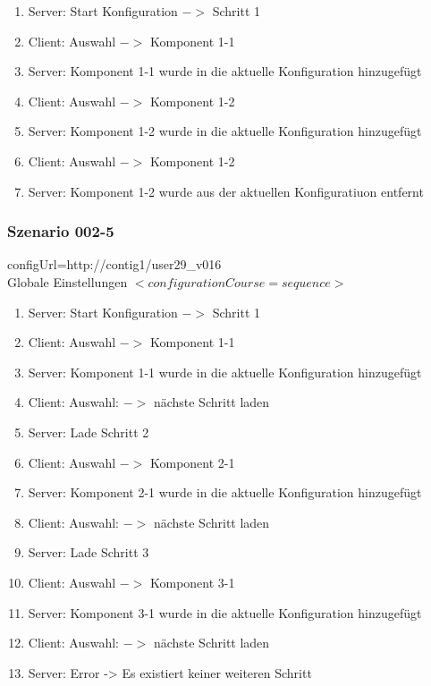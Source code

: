 \documentclass{article}
\begin{document}
\begin{enumerate}
  \item Server: Start Konfiguration $->$ Schritt 1
  \item Client: Auswahl $->$ Komponent 1-1
  \item Server: Komponent 1-1 wurde in die aktuelle Konfiguration hinzugef\"ugt
  \item Client: Auswahl $->$ Komponent 1-2
  \item Server: Komponent 1-2 wurde in die aktuelle Konfiguration hinzugef\"ugt
  \item Client: Auswahl $->$ Komponent 1-2
  \item Server: Komponent 1-2 wurde aus der aktuellen Konfiguratiuon entfernt
\end{enumerate}

\subsubsection{Szenario 002-5}

configUrl=http://contig1/user29\_v016\\

Globale Einstellungen $<configurationCourse=sequence>$

\begin{enumerate}
  \item Server: Start Konfiguration $->$ Schritt 1
  \item Client: Auswahl $->$ Komponent 1-1
  \item Server: Komponent 1-1 wurde in die aktuelle Konfiguration hinzugef\"ugt
  \item Client: Auswahl: $->$ n\"achste Schritt laden
  \item Server: Lade Schritt 2
  \item Client: Auswahl $->$ Komponent 2-1
  \item Server: Komponent 2-1 wurde in die aktuelle Konfiguration hinzugef\"ugt
  \item Client: Auswahl: $->$ n\"achste Schritt laden
  \item Server: Lade Schritt 3
  \item Client: Auswahl $->$ Komponent 3-1
  \item Server: Komponent 3-1 wurde in die aktuelle Konfiguration hinzugef\"ugt
  \item Client: Auswahl: $->$ n\"achste Schritt laden
  \item Server: Error -> Es existiert keiner weiteren Schritt
\end{enumerate}
\end{document}
